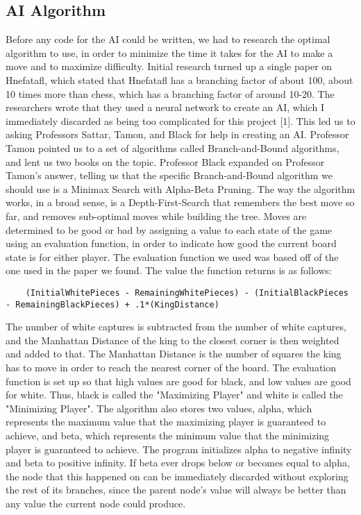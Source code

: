 \documentclass{article}
\begin{document}
\subsection{AI Algorithm}
	Before any code for the AI could be written, we had to research the optimal algorithm to use, in order to minimize the time it takes for the AI to make a move and to maximize difficulty. Initial research turned up a single paper on Hnefatafl, which stated that Hnefatafl has a branching factor of about 100, about 10 times more than chess, which has a branching factor of around 10-20. The researchers wrote that they used a neural network to create an AI, which I immediately discarded as being too complicated for this project [1]. This led us to asking Professors Sattar, Tamon, and Black for help in creating an AI. Professor Tamon pointed us to a set of algorithms called Branch-and-Bound algorithms, and lent us two books on the topic. Professor Black expanded on Professor Tamon's answer, telling us that the specific Branch-and-Bound algorithm we should use is a Minimax Search with Alpha-Beta Pruning. 
	The way the algorithm works, in a broad sense, is a Depth-First-Search that remembers the best move so far, and removes sub-optimal moves while building the tree. Moves are determined to be good or bad by assigning a value to each state of the game using an evaluation function, in order to indicate how good the current board state is for either player. The evaluation function we used was based off of the one used in the paper we found. The value the function returns is as follows:
\begin{lstlisting}
	(InitialWhitePieces - RemainingWhitePieces) - (InitialBlackPieces - RemainingBlackPieces) + .1*(KingDistance)
\end{lstlisting}
The number of white captures is subtracted from the number of white captures, and the Manhattan Distance of the king to the closest corner is then weighted and added to that. The Manhattan Distance is the number of squares the king has to move in order to reach the nearest corner of the board. The evaluation function is set up so that high values are good for black, and low values are good for white. Thus, black is called the "Maximizing Player" and white is called the "Minimizing Player". The algorithm also stores two values, alpha, which represents the maximum value that the maximizing player is guaranteed to achieve, and beta, which represents the minimum value that the minimizing player is guaranteed to achieve. The program initializes alpha to negative infinity and beta to positive infinity. If beta ever drops below or becomes equal to alpha, the node that this happened on can be immediately discarded without exploring the rest of its branches, since the parent node's value will always be better than any value the current node could produce. 
\end{document}
